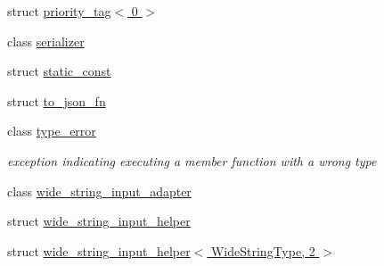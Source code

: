 \begin{DoxyCompactItemize}
struct \hyperlink{structnlohmann_1_1detail_1_1priority__tag_3_010_01_4}{priority\+\_\+tag$<$ 0 $>$}
\item 
class \hyperlink{classnlohmann_1_1detail_1_1serializer}{serializer}
\item 
struct \hyperlink{structnlohmann_1_1detail_1_1static__const}{static\+\_\+const}
\item 
struct \hyperlink{structnlohmann_1_1detail_1_1to__json__fn}{to\+\_\+json\+\_\+fn}
\item 
class \hyperlink{classnlohmann_1_1detail_1_1type__error}{type\+\_\+error}
\begin{DoxyCompactList}\small\item\em exception indicating executing a member function with a wrong type \end{DoxyCompactList}\item 
class \hyperlink{classnlohmann_1_1detail_1_1wide__string__input__adapter}{wide\+\_\+string\+\_\+input\+\_\+adapter}
\item 
struct \hyperlink{structnlohmann_1_1detail_1_1wide__string__input__helper}{wide\+\_\+string\+\_\+input\+\_\+helper}
\item 
struct \hyperlink{structnlohmann_1_1detail_1_1wide__string__input__helper_3_01_wide_string_type_00_012_01_4}{wide\+\_\+string\+\_\+input\+\_\+helper$<$ Wide\+String\+Type, 2 $>$}
\end{DoxyCompactItemize}
